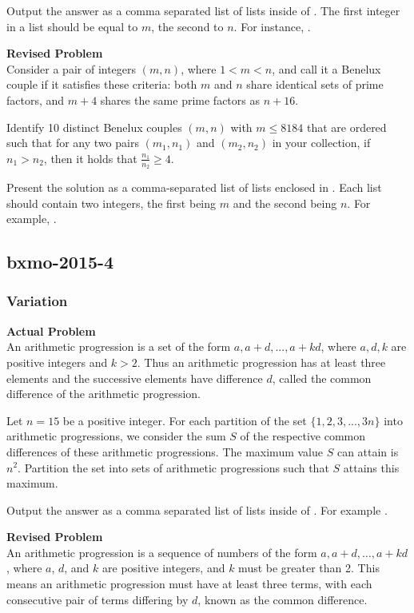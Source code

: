 Output the answer as a comma separated list of lists inside of . The first integer in a list should be equal to $m$, the second to $n$. For instance, .

\textbf{Revised Problem}\\
Consider a pair of integers $(m, n)$, where $1 < m < n$, and call it a Benelux couple if it satisfies these criteria: both $m$ and $n$ share identical sets of prime factors, and $m + 4$ shares the same prime factors as $n + 16$. 

Identify 10 distinct Benelux couples $(m, n)$ with $m \leqslant 8184$ that are ordered such that for any two pairs $(m_1, n_1)$ and $(m_2, n_2)$ in your collection, if $n_1 > n_2$, then it holds that $\frac{n_1}{n_2} \geqslant 4$.

Present the solution as a comma-separated list of lists enclosed in . Each list should contain two integers, the first being $m$ and the second being $n$. For example, .

\subsection{bxmo-2015-4}
\subsubsection{Variation}
\textbf{Actual Problem}\\
An arithmetic progression is a set of the form ${a, a+d, . . . , a+kd}$, where $a, d, k$ are positive integers and $k > 2$. Thus an arithmetic progression has at least three elements and the successive elements have difference $d$, called the common difference of the arithmetic progression.

Let $n = 15$ be a positive integer. For each partition of the set $\{1, 2, 3, ..., 3n\}$ into arithmetic progressions, we consider the sum $S$ of the respective common differences of these arithmetic progressions. The maximum value $S$ can attain is $n^2$. Partition the set into sets of arithmetic progressions such that $S$ attains this maximum.

Output the answer as a comma separated list of lists inside of . For example .

\textbf{Revised Problem}\\
An arithmetic progression is a sequence of numbers of the form ${a, a+d, \ldots, a+kd}$, where $a$, $d$, and $k$ are positive integers, and $k$ must be greater than 2. This means an arithmetic progression must have at least three terms, with each consecutive pair of terms differing by $d$, known as the common difference.

